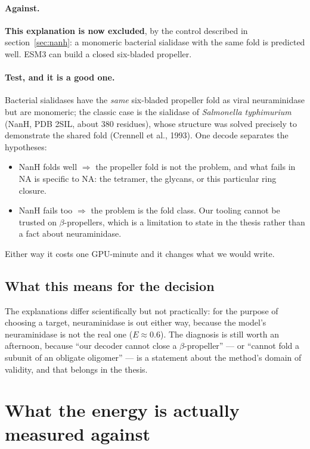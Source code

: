 \documentclass[11pt,a4paper]{article}
\begin{document}
\paragraph{Against.} \textbf{This explanation is now excluded}, by the control
described in section~\ref{sec:nanh}: a monomeric bacterial sialidase with the
same fold is predicted well. ESM3 can build a closed six-bladed propeller.

\paragraph{Test, and it is a good one.} Bacterial sialidases have the \emph{same}
six-bladed propeller fold as viral neuraminidase but are monomeric; the classic
case is the sialidase of \emph{Salmonella typhimurium} (NanH, PDB 2SIL, about 380
residues), whose structure was solved precisely to demonstrate the shared fold
(Crennell et al., 1993). One decode separates the hypotheses:
\begin{itemize}
  \item NanH folds well $\Rightarrow$ the propeller fold is not the problem, and
        what fails in NA is specific to NA: the tetramer, the glycans, or this
        particular ring closure.
  \item NanH fails too $\Rightarrow$ the problem is the fold class. Our tooling
        cannot be trusted on $\beta$-propellers, which is a limitation to state
        in the thesis rather than a fact about neuraminidase.
\end{itemize}
Either way it costs one GPU-minute and it changes what we would write.

\subsection{What this means for the decision}

The explanations differ scientifically but not practically: for the purpose of
choosing a target, neuraminidase is out either way, because the model's
neuraminidase is not the real one ($E\approx0.6$). The diagnosis is still worth
an afternoon, because ``our decoder cannot close a $\beta$-propeller'' --- or
``cannot fold a subunit of an obligate oligomer'' --- is a statement about the
method's domain of validity, and that belongs in the thesis.

\section{What the energy is actually measured against}\label{sec:r0}
\end{document}
